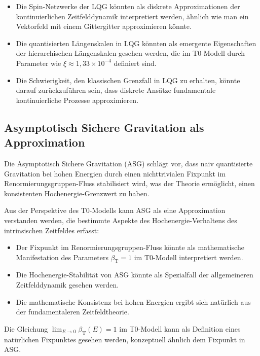 \documentclass[12pt,a4paper]{article}
\newcommand{\betaT}{\beta_{\text{T}}}
\begin{document}
	\begin{itemize}
		\item Die Spin-Netzwerke der LQG könnten als diskrete Approximationen der kontinuierlichen Zeitfelddynamik interpretiert werden, ähnlich wie man ein Vektorfeld mit einem Gittergitter approximieren könnte.
		
		\item Die quantisierten Längenskalen in LQG könnten als emergente Eigenschaften der hierarchischen Längenskalen gesehen werden, die im T0-Modell durch Parameter wie $\xi \approx 1,33 \times 10^{-4}$ definiert sind.
		
		\item Die Schwierigkeit, den klassischen Grenzfall in LQG zu erhalten, könnte darauf zurückzuführen sein, dass diskrete Ansätze fundamentale kontinuierliche Prozesse approximieren.
	\end{itemize}
	
	\subsection{Asymptotisch Sichere Gravitation als Approximation}
	\label{subsec:asg}
	
	Die Asymptotisch Sichere Gravitation (ASG) schlägt vor, dass naiv quantisierte Gravitation bei hohen Energien durch einen nichttrivialen Fixpunkt im Renormierungsgruppen-Fluss stabilisiert wird, was der Theorie ermöglicht, einen konsistenten Hochenergie-Grenzwert zu haben.
	
	Aus der Perspektive des T0-Modells kann ASG als eine Approximation verstanden werden, die bestimmte Aspekte des Hochenergie-Verhaltens des intrinsischen Zeitfeldes erfasst:
	
	\begin{itemize}
		\item Der Fixpunkt im Renormierungsgruppen-Fluss könnte als mathematische Manifestation des Parameters $\betaT = 1$ im T0-Modell interpretiert werden.
		
		\item Die Hochenergie-Stabilität von ASG könnte als Spezialfall der allgemeineren Zeitfelddynamik gesehen werden.
		
		\item Die mathematische Konsistenz bei hohen Energien ergibt sich natürlich aus der fundamentaleren Zeitfeldtheorie.
	\end{itemize}
	
	Die Gleichung $\lim_{E \to 0} \betaT(E) = 1$ im T0-Modell \cite{pascher_alphabeta_2025} kann als Definition eines natürlichen Fixpunktes gesehen werden, konzeptuell ähnlich dem Fixpunkt in ASG.
	
\end{document}
